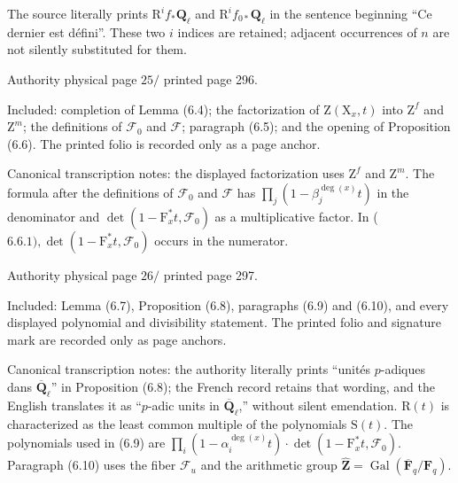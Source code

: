 \documentclass[10pt,leqno]{article}
\begin{document}
\noindent The source literally prints \(\mathrm{R}^{i} f_{*}\mathbf{Q}_{\ell }\) and \(\mathrm{R}^{i} f_{0*}\mathbf{Q}_{\ell }\) in the sentence beginning “Ce dernier est défini”. These two \(i\) indices are retained; adjacent occurrences of \(n\) are not silently substituted for them.\par

\clearpage

\label{physical-25}\par\smallskip

\noindent Authority physical page \(25 /\) printed page 296.\par

\noindent Included: completion of Lemma (6.4); the factorization of \(\mathrm{Z}(\mathrm{X}_{x},t)\) into \(\mathrm{Z}^{f}\) and \(\mathrm{Z}^{m}\); the definitions of \(\mathcal{F} _{0}\) and \(\mathcal{F} \); paragraph (6.5); and the opening of Proposition (6.6). The printed folio is recorded only as a page anchor.\par

\noindent Canonical transcription notes: the displayed factorization uses \(\mathrm{Z}^{f}\) and \(\mathrm{Z}^{m}\). The formula after the definitions of \(\mathcal{F} _{0}\) and \(\mathcal{F} \) has \(\prod _{j}(1- \beta _{j}^{\operatorname{deg}(x)}t)\) in the denominator and \(\operatorname{det}(1- \mathrm{F}_{x}^{*}t,\mathcal{F} _{0})\) as a multiplicative factor. In (\(6.6.1), \operatorname{det}(1- \mathrm{F}_{x}^{*}t,\mathcal{F} _{0})\) occurs in the numerator.\par

\clearpage

\label{physical-26}\par\smallskip

\noindent Authority physical page \(26 /\) printed page 297.\par

\noindent Included: Lemma (6.7), Proposition (6.8), paragraphs (6.9) and (6.10), and every displayed polynomial and divisibility statement. The printed folio and signature mark are recorded only as page anchors.\par

\noindent Canonical transcription notes: the authority literally prints “unités \(p\)-adiques dans \(\overline{\mathbf{Q}}_{\ell }\)” in Proposition (6.8); the French record retains that wording, and the English translates it as “\(p\)-adic units in \(\overline{\mathbf{Q}}_{\ell }\),” without silent emendation. \(\mathrm{R}(t)\) is characterized as the least common multiple of the polynomials \(\mathrm{S}(t)\). The polynomials used in (6.9) are \(\prod _{i}(1- \alpha _{i}^{\operatorname{deg}(x)}t)\cdot \operatorname{det}(1- \mathrm{F}_{x}^{*}t,\mathcal{F} _{0})\). Paragraph (6.10) uses the fiber \(\mathcal{F} _{u}\) and the arithmetic group \(\widehat{\mathbf{Z}}=\operatorname{Gal}(\overline{\mathbf{F}}_{q}/\mathbf{F}_{q})\).\par
\end{document}
